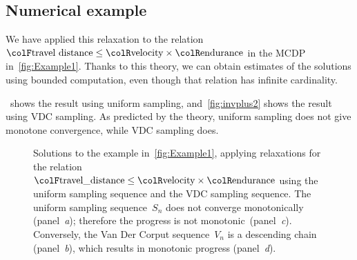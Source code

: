 \subsection{Numerical example}

We have applied this relaxation to the relation ${\colF\text{travel distance}}\leq{\colR\text{velocity}}\times{\colR\text{endurance}}$ in the MCDP in~\cref{fig:Example1}.
Thanks to this theory, we can obtain estimates of the solutions using bounded computation, even though that relation has infinite cardinality.

~shows the result using uniform sampling,
and~\cref{fig:invplus2} shows the result using VDC sampling.
As predicted by the theory, uniform sampling does not give monotone
convergence, while VDC sampling does.
\begin{figure}[t]
    \centering
    \centering
    
    \caption{Solutions to the example in~\cref{fig:Example1}, applying relaxations
    for the relation ${\colF\text{travel\_distance}}\leq{\colR\text{velocity}}\times{\colR\text{endurance}}$
        using the uniform sampling sequence and the VDC sampling sequence.
        The uniform sampling sequence~$S_{n}$ does not converge monotonically
        (panel~\emph{a}); therefore the progress is not monotonic~(panel\emph{~c}).
        Conversely, the Van Der Corput sequence~$V_{n}$ is a descending
        chain (panel~\emph{b}), which results in monotonic progress (panel~\emph{d}).}
\end{figure}


